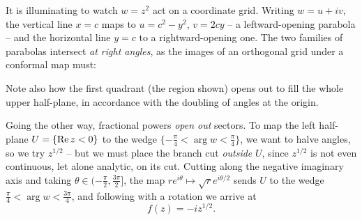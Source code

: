 \documentclass[a4paper]{scrartcl}
\begin{document}
It is illuminating to watch $w = z^2$ act on a coordinate grid. Writing $w = u + iv$, the vertical line $x = c$ maps to $u = c^2 - y^2$, $v = 2cy$ -- a leftward-opening parabola -- and the horizontal line $y = c$ to a rightward-opening one. The two families of parabolas intersect \emph{at right angles}, as the images of an orthogonal grid under a conformal map must:
\begin{center}
\end{center}
Note also how the first quadrant (the region shown) opens out to fill the whole upper half-plane, in accordance with the doubling of angles at the origin.

Going the other way, fractional powers \emph{open out} sectors. To map the left half-plane $U = \{ \operatorname{Re} z < 0\}$ to the wedge $\{-\frac{\pi}{4} < \arg w < \frac{\pi}{4}\}$, we want to halve angles, so we try $z^{1/2}$ -- but we must place the branch cut \emph{outside} $U$, since $z^{1/2}$ is not even continuous, let alone analytic, on its cut. Cutting along the negative imaginary axis and taking $\theta \in (-\frac{\pi}{2}, \frac{3\pi}{2}]$, the map $re^{i\theta} \mapsto \sqrt{r} e^{i\theta/2}$ sends $U$ to the wedge $\frac{\pi}{4} < \arg w < \frac{3\pi}{4}$, and following with a rotation we arrive at
$$
f(z) = -i z^{1/2}.
$$
\end{document}

